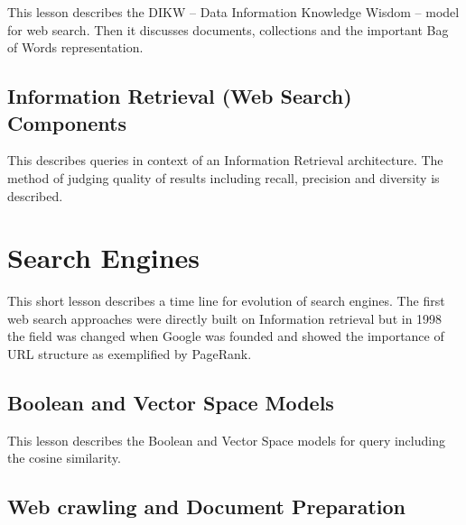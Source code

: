 
This lesson describes the DIKW -- Data Information Knowledge Wisdom --
model for web search. Then it discusses documents, collections and the
important Bag of Words representation.



\subsection{Information Retrieval (Web Search) Components}


This describes queries in context of an Information Retrieval
architecture. The method of judging quality of results including recall,
precision and diversity is described.


\section{Search Engines}\label{search-engines}


This short lesson describes a time line for evolution of search engines.
The first web search approaches were directly built on Information
retrieval but in 1998 the field was changed when Google was founded and
showed the importance of URL structure as exemplified by PageRank.



\subsection{Boolean and Vector Space Models}


This lesson describes the Boolean and Vector Space models for query
including the cosine similarity.



\subsection{Web crawling and Document Preparation}


